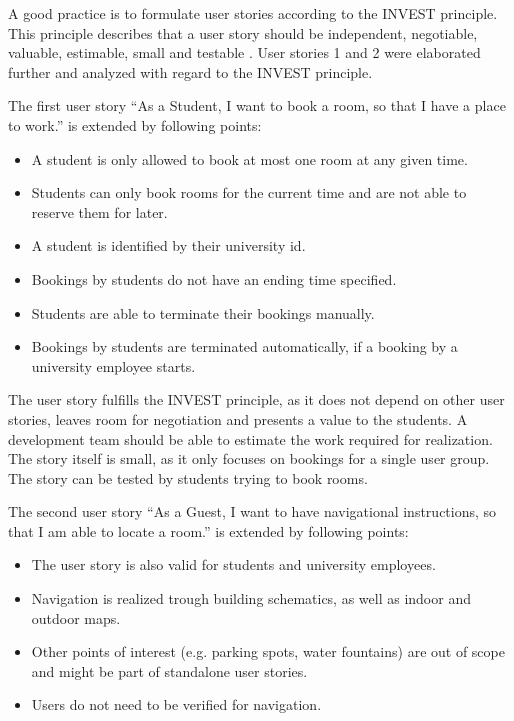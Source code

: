 \documentclass[article,onecolumn]{IEEEtran}
\begin{document}
A good practice is to formulate user stories according to the INVEST principle.
This principle describes that a user story should be independent, negotiable, valuable, estimable, small and testable \cite{Buglione_2013}.
User stories 1 and 2 were elaborated further and analyzed with regard to the INVEST principle.

The first user story ``As a Student, I want to book a room, so that I have a place to work.'' is extended by following points:

\begin{itemize}
	\item A student is only allowed to book at most one room at any given time.
	\item Students can only book rooms for the current time and are not able to reserve them for later.
	\item A student is identified by their university id.
	\item Bookings by students do not have an ending time specified.
	\item Students are able to terminate their bookings manually.
	\item Bookings by students are terminated automatically, if a booking by a university employee starts.
\end{itemize}

The user story fulfills the INVEST principle, as it does not depend on other user stories, leaves room for negotiation and presents a value to the students.
A development team should be able to estimate the work required for realization. The story itself is small, as it only focuses on bookings for a single user group.
The story can be tested by students trying to book rooms.

The second user story ``As a Guest, I want to have navigational instructions, so that I am able to locate a room.'' is extended by following points:

\begin{itemize}
	\item The user story is also valid for students and university employees.
	\item Navigation is realized trough  building schematics, as well as indoor and outdoor maps.
	\item Other points of interest (e.g. parking spots, water fountains) are out of scope and might be part of standalone user stories.
	\item Users do not need to be verified for navigation.
\end{itemize}
\end{document}
